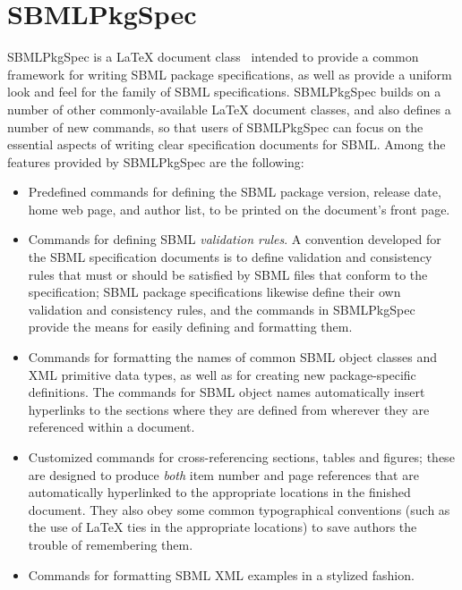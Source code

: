\documentclass{bmcart}
\newcommand{\sbmlpkg}{SBMLPkgSpec}
\begin{document}
\section*{SBMLPkgSpec}

\sbmlpkg{} is a LaTeX document class~\cite{lamport1994} intended to provide a common framework for writing SBML package specifications, as well as provide a uniform look and feel for the family of SBML specifications.  \sbmlpkg{} builds on a number of other commonly-available LaTeX document classes, and also defines a number of new commands, so that users of \sbmlpkg{} can focus on the essential aspects of writing clear specification documents for SBML.  Among the features provided by \sbmlpkg{} are the following:

\begin{itemize}

\item Predefined commands for defining the SBML package version, release date, home web page, and author list, to be printed on the document's front page.

\item Commands for defining SBML \emph{validation rules}.  A convention developed for the SBML specification documents is to define validation and consistency rules that must or should be satisfied by SBML files that conform to the specification; SBML package specifications likewise define their own validation and consistency rules, and the commands in \sbmlpkg{} provide the means for easily defining and formatting them.

\item Commands for formatting the names of common SBML object classes and XML primitive data types, as well as for creating new package-specific definitions.  The commands for SBML object names automatically insert hyperlinks to the sections where they are defined from wherever they are  referenced within a document.

\item Customized commands for cross-referencing sections, tables and figures; these are designed to produce \emph{both} item number and page references that are automatically hyperlinked to the appropriate locations in the finished document. They also obey some common typographical conventions (such as the use of LaTeX ties in the appropriate locations) to save authors the trouble of remembering them.

\item Commands for formatting SBML XML examples in a stylized fashion.


\end{itemize}
\end{document}
